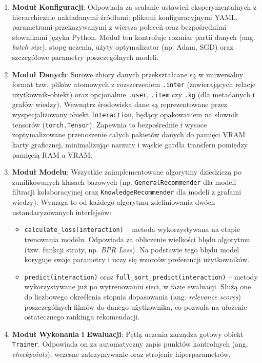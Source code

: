 \begin{enumerate}
    \item \textbf{Moduł Konfiguracji}: Odpowiada za scalanie ustawień eksperymentalnych z hierarchicznie nakładanymi źródłami: plikami konfiguracyjnymi YAML, parametrami przekazywanymi z wiersza poleceń oraz bezpośrednimi słownikami języka Python. Moduł ten kontroluje rozmiar partii danych (ang. \foreignlanguage{english}{\textit{batch size}}), stopę uczenia, użyty optymalizator (np. Adam, SGD) oraz szczegółowe parametry poszczególnych modeli.

    \item \textbf{Moduł Danych}: Surowe zbiory danych przekształcane są w uniwersalny format tzw. plików atomowych z rozszerzeniem \texttt{.inter} (zawierających relacje użytkownik-obiekt) oraz opcjonalnie \texttt{.user}, \texttt{.item} czy \texttt{.kg} (dla metadanych i grafów wiedzy). Wewnątrz środowiska dane są reprezentowane przez wyspecjalizowany obiekt \texttt{Interaction}, będący opakowaniem na słownik tensorów (\texttt{torch.Tensor}). Zapewnia to bezpośrednie i wysoce zoptymalizowane przenoszenie całych pakietów danych do pamięci VRAM karty graficznej, minimalizując narzuty i wąskie gardła transferu pomiędzy pamięcią RAM a VRAM.

    \item \textbf{Moduł Modelu}: Wszystkie zaimplementowane algorytmy dziedziczą po zunifikowanych klasach bazowych (np. \texttt{GeneralRecommender} dla modeli filtracji kolaboracyjnej oraz \texttt{KnowledgeRecommender} dla modeli z grafami wiedzy). Wymaga to od każdego algorytmu zdefiniowania dwóch ustandaryzowanych interfejsów:
          \begin{itemize}
              \item \texttt{calculate\_loss(interaction)} -- metoda wykorzystywana na etapie trenowania modelu. Odpowiada za obliczenie wielkości błędu algorytmu (tzw. funkcji straty, np. \foreignlanguage{english}{\textit{BPR Loss}}). Na podstawie tego błędu model koryguje swoje parametry i uczy się wzorców preferencji użytkowników.

              \item \texttt{predict(interaction)} oraz \texttt{full\_sort\_predict(interaction)} -- metody wykorzystywane już po wytrenowaniu sieci, w fazie ewaluacji. Służą one do liczbowego określenia stopnia dopasowania (ang. \foreignlanguage{english}{\textit{relevance scores}}) poszczególnych filmów do danego użytkownika, co pozwala na ułożenie ostatecznego rankingu rekomendacji.
          \end{itemize}

    \item \textbf{Moduł Wykonania i Ewaluacji}: Pętlą uczenia zarządza gotowy obiekt \texttt{Trainer}. Odpowiada on za automatyczny zapis punktów kontrolnych (ang. \foreignlanguage{english}{\textit{checkpoints}}), wczesne zatrzymywanie oraz strojenie hiperparametrów.
\end{enumerate}

